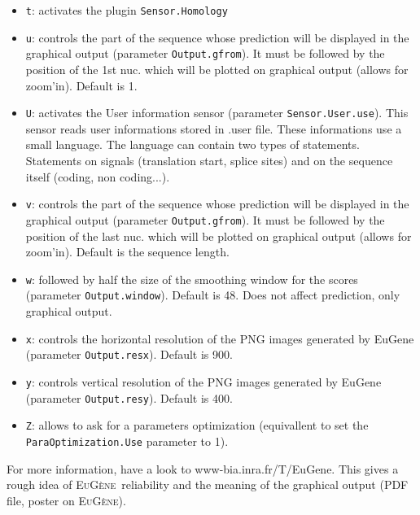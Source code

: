 \documentclass[a4paper,titlepage]{report}
\newcommand{\EuGene}{\textsc{EuG\`ene}}
\begin{document}
\begin{itemize}
\item \texttt{t}: activates the plugin \texttt{Sensor.Homology}

\item \texttt{u}: controls the part of the sequence whose prediction will be
  displayed in the graphical output (parameter \texttt{Output.gfrom}). It must
  be followed by the position of the 1st nuc. which will be plotted on
  graphical output (allows for zoom'in).  Default is 1.
  
\item \texttt{U}: activates the User information sensor (parameter
  \texttt{Sensor.User.use}). This sensor reads user informations
  stored in .user file. These informations use a small language. The
  language can contain two types of statements. Statements on signals
  (translation start, splice sites) and on the sequence itself
  (coding, non coding...).
  
\item \texttt{v}: controls the part of the sequence whose prediction will be
  displayed in the graphical output (parameter \texttt{Output.gfrom}).
  It must be followed by the position of the last nuc. which will be
  plotted on graphical output (allows for zoom'in). Default is the
  sequence length.
  
\item \texttt{w}: followed by half the size of the smoothing window for the
  scores (parameter \texttt{Output.window}). Default is 48. Does not
  affect prediction, only graphical output.

\item \texttt{x}: controls the horizontal resolution of the PNG images
  generated by EuGene (parameter \texttt{Output.resx}). Default is 900.
  
\item \texttt{y}: controls vertical resolution of the PNG images generated by
  EuGene (parameter \texttt{Output.resy}).  Default is 400.

\item \texttt{Z}: allows to ask for a parameters optimization (equivallent to
  set the \texttt{ParaOptimization.Use} parameter to 1).
\end{itemize}



For more information, have a look to
\textsf{www-bia.inra.fr/T/EuGene}. This gives a rough idea of \EuGene\ 
reliability and the meaning of the graphical output (PDF file, poster
on \EuGene).
\end{document}

